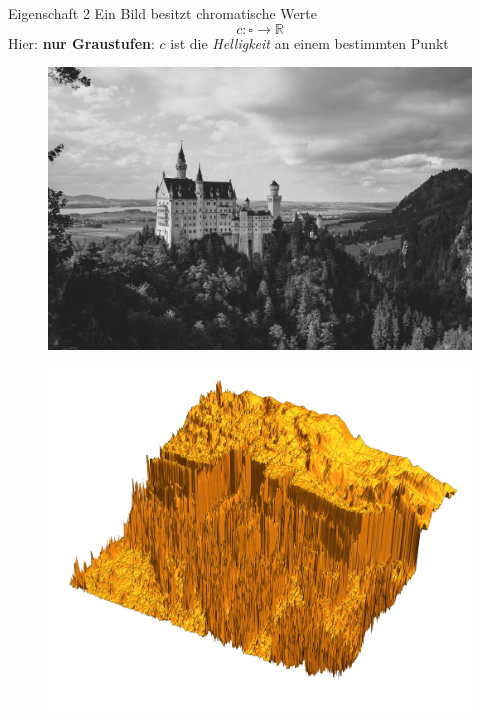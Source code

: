 \documentclass[10pt]{beamer}
\newcommand{\R}{\mathbb{R}}
\begin{document}
\begin{frame}{Eigenschaft 2}
  Ein Bild besitzt \alert{chromatische Werte}
  \begin{equation*}
    c: \square \to \R
  \end{equation*}
  Hier: \textbf{nur Graustufen}: \( c \) ist die \emph{Helligkeit} an einem bestimmten Punkt

  \begin{minipage}{.45\textwidth}
    \begin{figure}
      \includegraphics[width=\textwidth]{neuschwanstein-sw}
    \end{figure}
  \end{minipage}
  \hfill
  \begin{minipage}{.45\textwidth}
    \begin{figure}
      \includegraphics[width=\textwidth]{neuschwanstein-chromatic}
    \end{figure}
  \end{minipage}
\end{frame}
\end{document}
